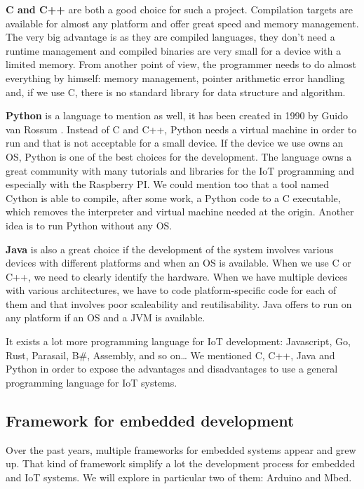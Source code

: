 \textbf{C and C++} are both a good choice for such a project. Compilation targets are
available for almost any platform and offer great speed and memory management.
The very big advantage is as they are compiled languages, they don't need a
runtime management and compiled binaries are very small for a device with a
limited memory. From another point of view, the programmer needs to do almost
everything by himself: memory management, pointer arithmetic error handling
and, if we use C, there is no standard library for data structure and algorithm.

\textbf{Python} is a language to mention as well, it has been created in 1990
by Guido van Rossum \cite{Rossum:1995:PRM:869369}. Instead of C and C++, Python
needs a virtual machine in order to run and that is not acceptable for a small
device. If the device we use owns an \gls{OS}, Python is one of the best choices
for the development. The language owns a great community with many tutorials
and libraries for the \gls{IoT} programming and especially with the Raspberry PI. We
could mention too that a tool named Cython\cite{behnel2010cython} is able to
compile, after some work, a Python code to a C executable, which removes the
interpreter and virtual machine needed at the origin. Another idea is to run
Python without any \gls{OS}\cite{jakeedge2015}.

\textbf{Java} is also a great choice if the development of the system involves
various devices with different platforms and when an \gls{OS} is available. When we use C
or C++, we need to clearly identify the hardware. When we have
multiple devices with various architectures, we have to code platform-specific
code for each of them and that involves poor scaleability and reutilisability.
Java offers to run on any platform if an \gls{OS} and a \gls{JVM} is available.

It exists a lot more programming language for \gls{IoT} development: Javascript,
Go, Rust, Parasail, B\#, Assembly, and so on… We mentioned C, C++, Java and
Python in order to expose the advantages and disadvantages to use a general
programming language for \gls{IoT} systems.

\subsection{Framework for embedded development}
\label{sec:framework_for_embeded_dev}

Over the past years, multiple frameworks for embedded systems appear and grew up.
That kind of framework simplify a lot the development process for embedded and
\gls{IoT} systems. We will explore in particular two of them: Arduino and
Mbed.

